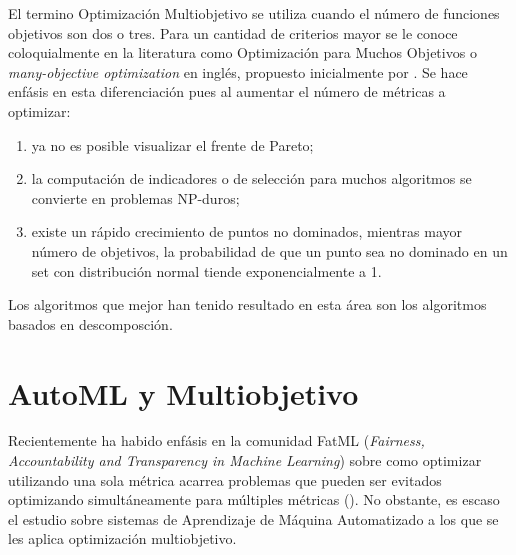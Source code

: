  El termino Optimizaci\'on Multiobjetivo se utiliza cuando el n\'umero de funciones objetivos son dos o tres. Para un cantidad de criterios mayor se le conoce coloquialmente en la literatura como Optimizaci\'on para Muchos Objetivos o \textit{many-objective optimization} en ingl\'es, propuesto inicialmente por \cite{10.1007/978-3-540-31880-4_2}. Se hace enf\'asis en esta diferenciaci\'on pues al aumentar el n\'umero de m\'etricas a optimizar:
 \begin{enumerate}
     \item ya no es posible visualizar el frente de Pareto;
     \item la computaci\'on de indicadores o de selecci\'on para muchos algoritmos se convierte en problemas NP-duros;
     \item existe un r\'apido crecimiento de puntos no dominados, mientras mayor n\'umero de objetivos, la probabilidad de que un punto sea no dominado en un set con distribuci\'on normal tiende exponencialmente a 1.
 \end{enumerate}

Los algoritmos que mejor han tenido resultado en esta \'area son los algoritmos basados en descomposci\'on.


\section{AutoML y Multiobjetivo}\label{background:mooautoml}

Recientemente ha habido enf\'asis en la comunidad FatML (\textit{Fairness, Accountability and Transparency in Machine Learning}) sobre como optimizar utilizando una sola m\'etrica acarrea problemas que pueden ser evitados optimizando simult\'aneamente para m\'ultiples m\'etricas (\cite{barocas2017fairness}). No obstante, es escaso el estudio sobre sistemas de Aprendizaje de M\'aquina Automatizado a los que se les aplica optimizaci\'on multiobjetivo.

